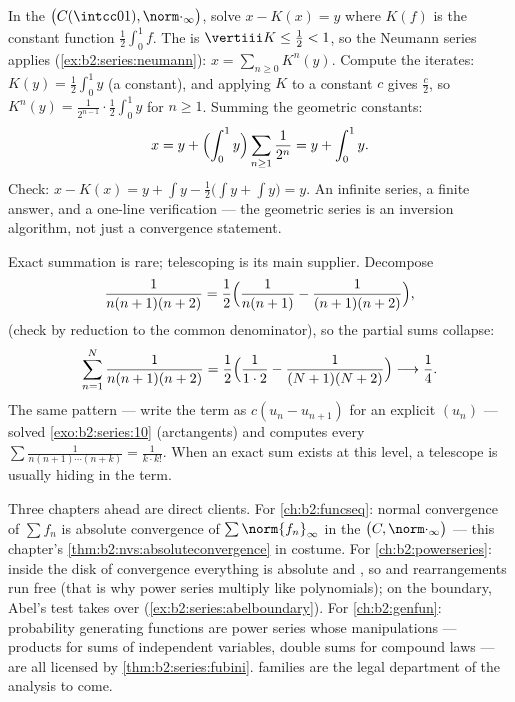 \begin{example}\label{ex:b2:series:neumannsolve}
In the  $\bigl(C(\intcc01),
\norm\cdot_\infty\bigr)$, solve $x - K(x) = y$ where $K(f)$ is
the constant function $\frac12\int_0^1 f$. The  is
$\vertiii K \leq \frac12 < 1$, so the Neumann series applies
(\cref{ex:b2:series:neumann}): $x = \sum_{n\geq0} K^n(y)$.
Compute the iterates: $K(y) = \frac12\int_0^1 y$ (a constant),
and applying $K$ to a constant $c$ gives $\frac c2$, so
$K^n(y) = \frac{1}{2^{n-1}}\cdot\frac12\int_0^1 y$ for $n \geq
1$. Summing the geometric constants:
\[
x = y + \Bigl(\int_0^1 y\Bigr)
\sum_{n\geq1}\frac{1}{2^n} = y + \int_0^1 y .
\]
Check: $x - K(x) = y + \int y - \frac12\bigl(\int y + \int
y\bigr) = y$. An infinite series, a finite answer, and a
one-line verification --- the geometric series is an inversion
algorithm, not just a convergence statement.
\end{example}

\begin{example}\label{ex:b2:series:telescope}
Exact summation is rare; telescoping is its main supplier.
Decompose
\[
\frac{1}{n(n+1)(n+2)}
= \frac{1}{2}\Bigl(\frac{1}{n(n+1)} -
\frac{1}{(n+1)(n+2)}\Bigr),
\]
(check by reduction to the common denominator), so the partial
sums collapse:
\[
\sum_{n=1}^{N}\frac{1}{n(n+1)(n+2)}
= \frac12\Bigl(\frac{1}{1\cdot2} -
\frac{1}{(N+1)(N+2)}\Bigr)
\longrightarrow \frac14 .
\]
The same pattern --- write the term as $c(u_n - u_{n+1})$ for
an explicit $(u_n)$ --- solved \cref{exo:b2:series:10}
(arctangents) and computes every $\sum\frac{1}{n(n+1)\cdots(n +
k)} = \frac{1}{k\cdot k!}$. When an exact sum exists at this
level, a telescope is usually hiding in the term.
\end{example}

\begin{remark}\label{rem:b2:series:perspectives}
Three chapters ahead are direct clients. For
\cref{ch:b2:funcseq}: normal convergence of $\sum f_n$ is
absolute convergence of $\sum\norm{f_n}_\infty$ in the  $\bigl(C, \norm\cdot_\infty\bigr)$ --- this chapter's
\cref{thm:b2:nvs:absoluteconvergence} in costume. For
\cref{ch:b2:powerseries}: inside the disk of convergence
everything is absolute and , so  and
rearrangements run free (that is why power series multiply like
polynomials); on the boundary, Abel's test takes over
(\cref{ex:b2:series:abelboundary}). For \cref{ch:b2:genfun}:
probability generating functions are power series whose
manipulations --- products for sums of independent variables,
double sums for compound laws --- are all licensed by
\cref{thm:b2:series:fubini}.  families are the legal
department of the analysis to come.
\end{remark}

